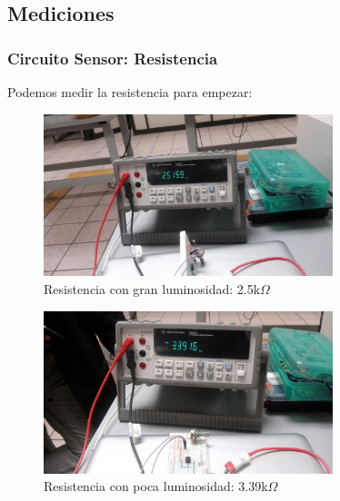\documentclass[12pt, fleqn]{article}                            %
\theoremstyle{break}                                            %
\begin{document}
    \clearpage
    \subsection{Mediciones}


        \subsubsection{Circuito Sensor: Resistencia}

            Podemos medir la resistencia para empezar:
            \begin{figure}[h]
                \centering
                \includegraphics[width=0.75\textwidth]{ResistenciaSensorLibre}
                \caption{Resistencia con gran luminosidad: 2.5k$\Omega$}
            \end{figure}

            \begin{figure}[h]
                \centering
                \includegraphics[width=0.75\textwidth]{ResistenciaSensorOcupado}
                \caption{Resistencia con poca luminosidad: 3.39k$\Omega$}
            \end{figure}
\end{document}
